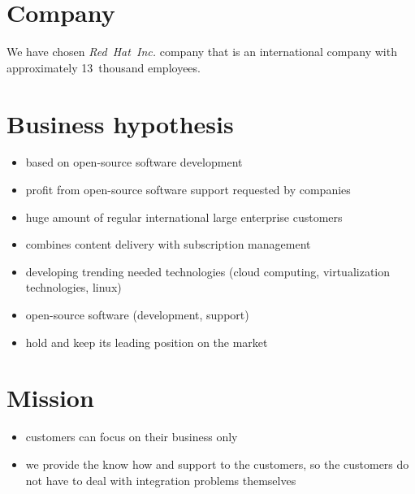 \documentclass[11pt,a4paper]{article}
\begin{document}
\newpage

\section{Company}

We have chosen \textit{Red~Hat~Inc.} company that is an international company with approximately 13~thousand employees.

\section{Business hypothesis}

\begin{itemize}
    \item based on open-source software development
    \item profit from open-source software support requested by companies
    \item huge amount of regular international large enterprise customers
    \item combines content delivery with subscription management
    \item developing trending needed technologies (cloud computing, virtualization technologies, linux)
    \item open-source software (development, support)
    \item hold and keep its leading position on the market
\end{itemize}

\section{Mission}

\begin{itemize}
    \item customers can focus on their business only
    \item we provide the know how and support to the customers, so the customers do not have to deal with integration problems themselves
\end{itemize}
\end{document}
